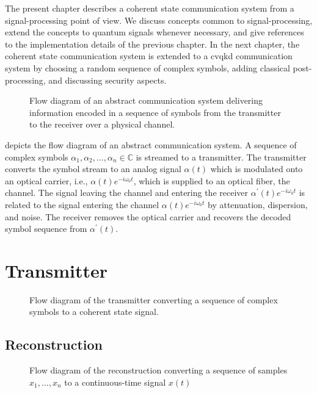 The present chapter describes a coherent state communication system from a signal-processing point of view.
We discuss concepts common to signal-processing, extend the concepts to quantum signals whenever necessary, and give references to the implementation details of the previous chapter.
In the next chapter, the coherent state communication system is extended to a \gls{cvqkd} communication system by choosing a random sequence of complex symbols, adding classical post-processing, and discussing security aspects.

\begin{figure}[htb]
	\centering
	
	\caption{Flow diagram of an abstract communication system delivering information encoded in a sequence of symbols from the transmitter to the receiver over a physical channel.}\label{fig:communication_system}
\end{figure}
 depicts the flow diagram of an abstract communication system.
A sequence of complex symbols $\alpha_1,\alpha_2,\dots,\alpha_n\in\mathbb{C}$ is  streamed to a transmitter.
The transmitter converts the symbol stream to an analog signal $\alpha(t)$ which is modulated onto an optical carrier, i.e., $\alpha(t)e^{-i\omega_0t}$, which is supplied to an optical fiber, the channel.
The signal leaving the channel and entering the receiver $\alpha^\prime(t)e^{-i\omega_0t}$ is related to the signal entering the channel $\alpha(t)e^{-i\omega_0t}$ by attenuation, dispersion, and noise.
The receiver removes the optical carrier and recovers the decoded symbol sequence from $\alpha^\prime(t)$.

\section{Transmitter}

\begin{figure}[htb]
	\centering
	
	\caption{Flow diagram of the transmitter converting a sequence of complex symbols to a coherent state signal.}\label{fig:transmitter}
\end{figure}

\subsection{Reconstruction}

\begin{figure}[htb]
	\centering
	
	\caption{Flow diagram of the reconstruction converting a sequence of samples $x_1,\dots,x_n$ to a continuous-time signal $x(t)$}\label{fig:transmitter}
\end{figure}

